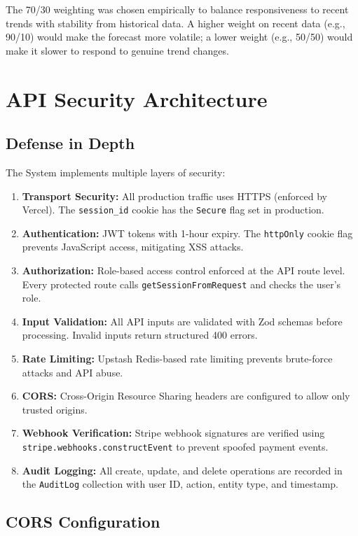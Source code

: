 \documentclass[12pt,a4paper]{report}
\begin{document}
The 70/30 weighting was chosen empirically to balance responsiveness to recent trends with stability from historical data. A higher weight on recent data (e.g., 90/10) would make the forecast more volatile; a lower weight (e.g., 50/50) would make it slower to respond to genuine trend changes.

\section{API Security Architecture}

\subsection{Defense in Depth}

The System implements multiple layers of security:

\begin{enumerate}[leftmargin=1.5em]
  \item \textbf{Transport Security:} All production traffic uses HTTPS (enforced by Vercel). The \texttt{session\_id} cookie has the \texttt{Secure} flag set in production.
  \item \textbf{Authentication:} JWT tokens with 1-hour expiry. The \texttt{httpOnly} cookie flag prevents JavaScript access, mitigating XSS attacks.
  \item \textbf{Authorization:} Role-based access control enforced at the API route level. Every protected route calls \texttt{getSessionFromRequest} and checks the user's role.
  \item \textbf{Input Validation:} All API inputs are validated with Zod schemas before processing. Invalid inputs return structured 400 errors.
  \item \textbf{Rate Limiting:} Upstash Redis-based rate limiting prevents brute-force attacks and API abuse.
  \item \textbf{CORS:} Cross-Origin Resource Sharing headers are configured to allow only trusted origins.
  \item \textbf{Webhook Verification:} Stripe webhook signatures are verified using \texttt{stripe.webhooks.constructEvent} to prevent spoofed payment events.
  \item \textbf{Audit Logging:} All create, update, and delete operations are recorded in the \texttt{AuditLog} collection with user ID, action, entity type, and timestamp.
\end{enumerate}

\subsection{CORS Configuration}
\end{document}
